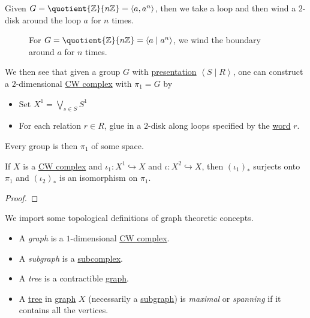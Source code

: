 \begin{eg}
	Given \(G = \quotient{\mathbb{\MakeUppercase{z}} }{n\mathbb{\MakeUppercase{z}} } = \left< a, a^n \right>  \), then we take a loop and then wind a \(2\)-disk
	around the loop \(a\) for \(n\) times.
	\begin{figure}[H]
		\centering
		\caption{For \(G = \quotient{\mathbb{\MakeUppercase{z}}}{n\mathbb{\MakeUppercase{z}} } = \left< a \mid a^n \right> \), we wind the boundary around \(a\) for \(n\) times.}
		\label{fig:lec12-eg}
	\end{figure}
\end{eg}

We then see that given a group \(G\) with \hyperref[def:group-presentation]{presentation} \(\left< S \mid R \right> \), one can construct a \(2\)-dimensional \hyperref[def:CW-Complex]{CW complex}
with \(\pi _1 = G\) by
\begin{itemize}
	\item Set \(X^1 = \bigvee_{s\in S} S^1\)
	\item For each relation \(r\in R\), glue in a \(2\)-disk along loops specified by the \hyperref[def:word]{word} \(r\).
\end{itemize}
Every group is then \(\pi _1\) of some space.

\begin{theorem}
	If \(X\) is a \hyperref[def:CW-Complex]{CW complex} and \(\iota _1\colon X^1\hookrightarrow X\) and \(\iota \colon X^2\hookrightarrow X\),
	then \((\iota _1)_{\ast}\) surjects onto \(\pi _1\) and \((\iota _2)_{\ast}\) is an isomorphism on \(\pi _1\).
\end{theorem}
\begin{proof}
\end{proof}

\begin{definition}\label{def:graph}\label{def:subgraph}\label{def:tree}\label{def:maximal-tree}
	We import some topological definitions of graph theoretic concepts.
	\begin{itemize}
		\item A \emph{graph} is a \(1\)-dimensional \hyperref[def:CW-Complex]{CW complex}.
		\item A \emph{subgraph} is a \hyperref[def:CW-subcomplex]{subcomplex}.
		\item A \emph{tree} is a contractible \hyperref[def:graph]{graph}.
		\item A \hyperref[def:tree]{tree} in \hyperref[def:graph]{graph} \(X\) (necessarily a \hyperref[def:subgraph]{subgraph}) is
		      \emph{maximal} or \emph{spanning} if it contains all the vertices.
	\end{itemize}
\end{definition}


